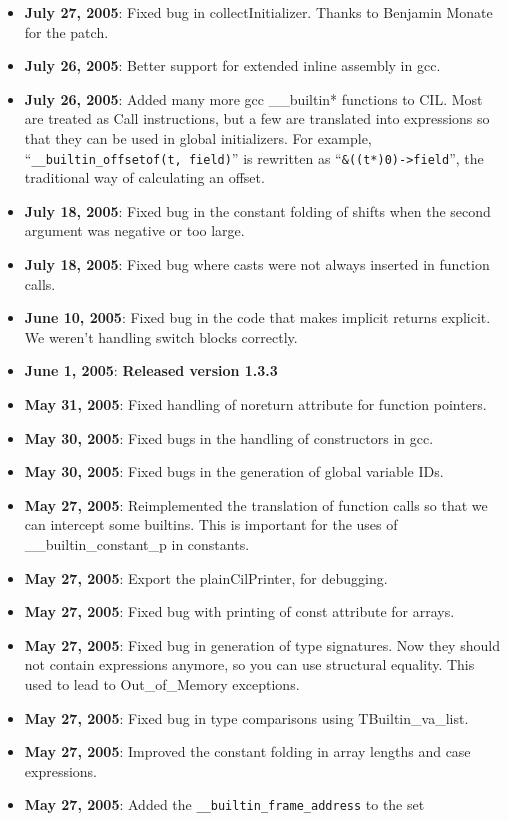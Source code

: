 \documentclass{article}
\def\t#1{{\tt #1}}
\begin{document}
\begin{itemize}
\item {\bf July 27, 2005}: Fixed bug in collectInitializer.  Thanks to
  Benjamin Monate for the patch.
\item {\bf July 26, 2005}: Better support for extended inline assembly
  in gcc.
\item {\bf July 26, 2005}: Added many more gcc \_\_builtin* functions
  to CIL.  Most are treated as Call instructions, but a few are
  translated into expressions so that they can be used in global
  initializers.  For example, ``\t{\_\_builtin\_offsetof(t, field)}'' is
  rewritten as ``\t{\&((t*)0)->field}'', the traditional way of calculating
  an offset.
\item {\bf July 18, 2005}: Fixed bug in the constant folding of shifts
  when the second argument was negative or too large.
\item {\bf July 18, 2005}: Fixed bug where casts were not always
  inserted in function calls.
\item {\bf June 10, 2005}: Fixed bug in the code that makes implicit
  returns explicit.  We weren't handling switch blocks correctly.
\item {\bf June 1, 2005}: {\bf Released version 1.3.3}
\item {\bf May 31, 2005}: Fixed handling of noreturn attribute for function
  pointers. 
\item {\bf May 30, 2005}: Fixed bugs in the handling of constructors in gcc.
\item {\bf May 30, 2005}: Fixed bugs in the generation of global variable IDs.
\item {\bf May 27, 2005}: Reimplemented the translation of function calls so
  that we can intercept some builtins. This is important for the uses of
  \_\_builtin\_constant\_p in constants. 
\item {\bf May 27, 2005}: Export the plainCilPrinter, for debugging.
\item {\bf May 27, 2005}: Fixed bug with printing of const attribute for
  arrays. 
\item {\bf May 27, 2005}: Fixed bug in generation of type signatures. Now they
  should not contain expressions anymore, so you can use structural equality.
  This used to lead to Out\_of\_Memory exceptions.
\item {\bf May 27, 2005}: Fixed bug in type comparisons using
  TBuiltin\_va\_list.
\item {\bf May 27, 2005}: Improved the constant folding in array lengths and
  case expressions. 
\item {\bf May 27, 2005}: Added the \t{\_\_builtin\_frame\_address} to the set

\end{itemize}
\end{document}
